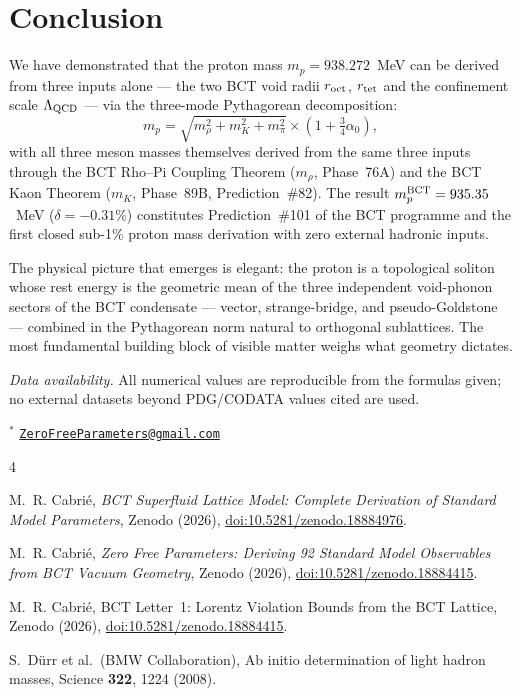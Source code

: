\documentclass[10pt,twocolumn]{article}
\begin{document}
\section{Conclusion}

We have demonstrated that the proton mass $m_p = 938.272$~MeV can be derived from three inputs
alone --- the two BCT void radii $r_{\rm oct}$, $r_{\rm tet}$ and the confinement scale
$\Lambda_{\rm QCD}$ --- via the three-mode Pythagorean decomposition:
\begin{equation}
m_p = \sqrt{m_\rho^2 + m_K^2 + m_\pi^2}
      \times\!\left(1 + \tfrac{3}{4}\alpha_0\right),
\label{eq:mpconc}
\end{equation}
with all three meson masses themselves derived from the same three inputs through the BCT
Rho--Pi Coupling Theorem ($m_\rho$, Phase~76A) and the BCT Kaon Theorem ($m_K$, Phase~89B,
Prediction~\#82). The result $m_p^{\rm BCT} = 935.35$~MeV ($\delta = -0.31\%$) constitutes
Prediction~\#101 of the BCT programme and the first closed sub-1\% proton mass derivation with
zero external hadronic inputs.

The physical picture that emerges is elegant: the proton is a topological soliton whose rest
energy is the geometric mean of the three independent void-phonon sectors of the BCT condensate
--- vector, strange-bridge, and pseudo-Goldstone --- combined in the Pythagorean norm natural
to orthogonal sublattices. The most fundamental building block of visible matter weighs what
geometry dictates.

\smallskip
\noindent\textit{Data availability.} All numerical values are reproducible from the formulas
given; no external datasets beyond PDG/CODATA values cited are used.

\bigskip
\noindent$^*$ \href{mailto:ZeroFreeParameters@gmail.com}{\texttt{ZeroFreeParameters@gmail.com}}

\begin{thebibliography}{4}

M.~R. Cabri\'{e}, \textit{BCT Superfluid Lattice Model: Complete Derivation of Standard Model
Parameters}, Zenodo (2026), \href{https://doi.org/10.5281/zenodo.18884976}{doi:10.5281/zenodo.18884976}.

M.~R. Cabri\'{e}, \textit{Zero Free Parameters: Deriving 92 Standard Model Observables from
BCT Vacuum Geometry}, Zenodo (2026),
\href{https://doi.org/10.5281/zenodo.18884415}{doi:10.5281/zenodo.18884415}.

M.~R. Cabri\'{e}, BCT Letter~1: Lorentz Violation Bounds from the BCT Lattice, Zenodo (2026),
\href{https://doi.org/10.5281/zenodo.18884415}{doi:10.5281/zenodo.18884415}.

S.~D\"{u}rr et al.\ (BMW Collaboration), Ab initio determination of light hadron masses,
Science \textbf{322}, 1224 (2008).

\end{thebibliography}
\end{document}
